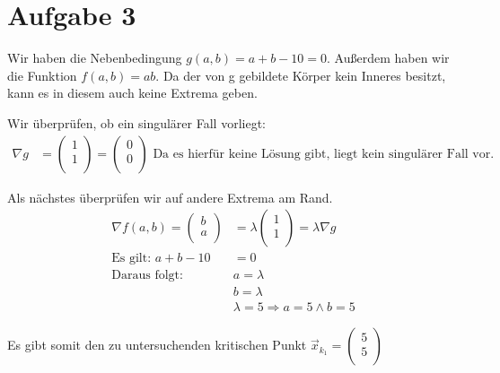 \documentclass[10pt,a4paper,parskip=half]{scrartcl}
\newcommand{\vectwo}[2]{\begin{pmatrix}#1\\#2\\\end {pmatrix}}
\begin{document}
\section*{Aufgabe 3}
Wir haben die Nebenbedingung $g(a,b) = a + b -10 = 0$. Außerdem haben wir die Funktion $f(a,b) = ab$. Da der von g gebildete Körper kein Inneres besitzt, kann es in diesem auch keine Extrema geben.

Wir überprüfen, ob ein singulärer Fall vorliegt: 
\begin{align*}
\nabla g &= \vectwo{1}{1} = \vectwo{0}{0} \text{ Da es hierfür keine Lösung gibt, liegt kein singulärer Fall vor.}
\end{align*}

Als nächstes überprüfen wir auf andere Extrema am Rand.
\begin{align*}
\nabla f(a,b) = \vectwo{b}{a} &= \lambda \vectwo{1}{1} = \lambda \nabla g \\
\text{Es gilt: } a + b - 10 &= 0 \\
\text{Daraus folgt: }& a = \lambda \\
& b = \lambda \\
& \lambda = 5 \Rightarrow a = 5 \land b = 5
\end{align*}

Es gibt somit den zu untersuchenden kritischen Punkt $\vec x_{k_1} = \vectwo{5}{5}$
\end{document}
